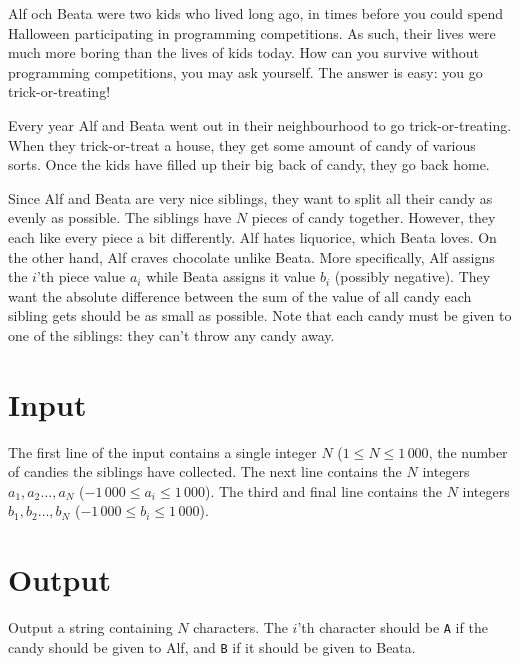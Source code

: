 Alf och Beata were two kids who lived long ago, in times before you could spend Halloween participating in programming competitions.
As such, their lives were much more boring than the lives of kids today.
How can you survive without programming competitions, you may ask yourself.
The answer is easy: you go trick-or-treating!

Every year Alf and Beata went out in their neighbourhood to go trick-or-treating.
When they trick-or-treat a house, they get some amount of candy of various sorts.
Once the kids have filled up their big back of candy, they go back home.

Since Alf and Beata are very nice siblings, they want to split all their candy as evenly as possible.
The siblings have $N$ pieces of candy together.
However, they each like every piece a bit differently.
Alf hates liquorice, which Beata loves.
On the other hand, Alf craves chocolate unlike Beata.
More specifically, Alf assigns the $i$'th piece value $a_i$ while Beata assigns it value $b_i$ (possibly negative).
They want the absolute difference between the sum of the value of all candy each sibling gets should be as small as possible.
Note that each candy must be given to one of the siblings: they can't throw any candy away.

\section*{Input}
The first line of the input contains a single integer $N$ ($1 \le N \le 1\,000$, the number of candies the siblings have collected.
The next line contains the $N$ integers $a_1, a_2 \dots, a_N$ ($-1\,000 \le a_i \le 1\,000$).
The third and final line contains the $N$ integers $b_1, b_2 \dots, b_N$ ($-1\,000 \le b_i \le 1\,000$).

\section*{Output}
Output a string containing $N$ characters.
The $i$'th character should be \texttt{A} if the candy should be given to Alf, and \texttt{B} if it should be given to Beata.
